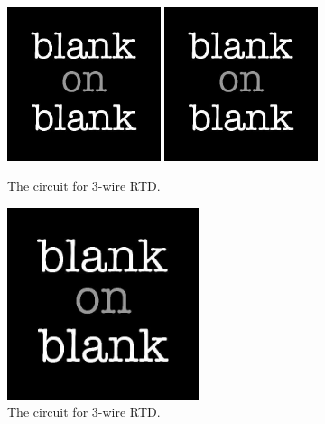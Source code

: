 \begin{figure}[h!]
  \centering
  \includegraphics[width=0.4\textwidth]
  {blank.jpg}
  \includegraphics[width=0.4\textwidth]
  {blank.jpg}
  \caption{The circuit for 3-wire RTD.}
  \label{fig: 3-wire circuit constant current}
\end{figure}

\begin{figure}[h!]
  \centering
  \includegraphics[width=0.5\textwidth]
  {blank.jpg}
  \caption{The circuit for 3-wire RTD.}
  \label{fig: 3-wire circuit bridge}
\end{figure}

